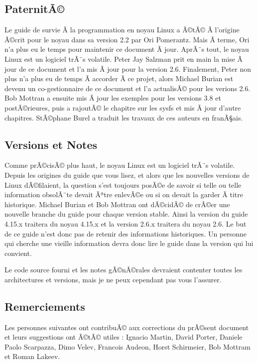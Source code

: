 \documentclass[11pt]{article}
\begin{document}
\subsection*{PaternitÃ©}
\label{sec-1-1}

Le guide de survie Ã  la programmation en noyau Linux a Ã©tÃ© Ã  l'origine Ã©crit pour le noyau dans sa version 2.2 par Ori Pomerantz. Mais Ã  terme, Ori n'a plus eu le temps pour maintenir ce document Ã  jour. AprÃ¨s tout, le noyau Linux est un logiciel trÃ¨s volatile. Peter Jay Salzman prit en main la mise Ã  jour de ce document et l'a mis Ã  jour pour la version 2.6. Finalement, Peter non plus n'a plus eu de temps Ã  accorder Ã  ce projet, alors Michael Burian est devenu un co-gestionnaire de ce document et l'a actualisÃ© pour les verions 2.6. Bob Mottran a ensuite mis Ã  jour les exemples pour les versions 3.8 et postÃ©rieures, puis a rajoutÃ© le chapitre sur les sysfs et mis Ã  jour d'autre chapitres. StÃ©phane Burel a traduit les travaux de ces auteurs en franÃ§ais.

\subsection*{Versions et Notes}
\label{sec-1-2}

Comme prÃ©cisÃ© plus haut, le noyau Linux est un logiciel trÃ¨s volatile. Depuis les origines du guide que vous lisez, et alors que les nouvelles versions de Linux dÃ©filaient, la question s'est toujours posÃ©e de savoir si telle ou telle information obsolÃ¨te devait Ãªtre enlevÃ©e ou si on devait la garder Ã  titre historique. Michael Burian et Bob Mottran ont dÃ©cidÃ© de crÃ©er une nouvelle branche du guide pour chaque version stable. Ainsi la version du guide 4.15.x traitera du noyau 4.15.x et la version 2.6.x traitera du noyau 2.6. Le but de ce guide n'est donc pas de retenir des informations historiques. Un personne qui cherche une vieille information devra donc lire le guide dans la version qui lui convient.

Le code source fourni et les notes gÃ©nÃ©rales devraient contenter toutes les architectures et versions, mais je ne peux cependant pas vous l'assurer.

\subsection*{Remerciements}
\label{sec-1-3}

Les personnes suivantes ont contribuÃ© aux corrections du prÃ©sent document et leurs suggestions ont Ã©tÃ© utiles : Ignacio Martin, David Porter, Daniele Paolo Scarpazza, Dimo Velev, Francois Audeon, Horst Schirmeier, Bob Mottram et Roman Lakeev.
\end{document}

